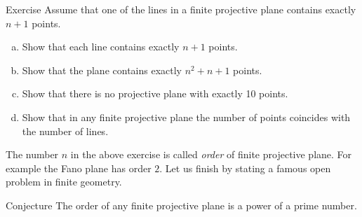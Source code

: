 \begin{thm}{Exercise}\label{ex:oder}
Assume that one of the lines in a finite projective plane contains exactly $n+1$ points.
\begin{enumerate}[(a)]
\item\label{ex:oder:a} Show that each line contains exactly $n+1$ points.
\item\label{ex:oder:b} Show that the plane contains  exactly $n^2+n+1$ points.
\item\label{ex:oder:c} Show that there is no projective plane with exactly 10 points.
\item\label{ex:oder:d} Show that in any finite projective plane the number of points coincides with the number of lines.
\end{enumerate}
\end{thm}

The number $n$ in the above exercise is called \emph{order} of finite projective plane.
For example the Fano plane has order $2$.
Let us finish by stating a famous open problem in finite geometry.

\begin{thm}{Conjecture}
The order of any finite projective plane is a power of a prime number.
\end{thm}

